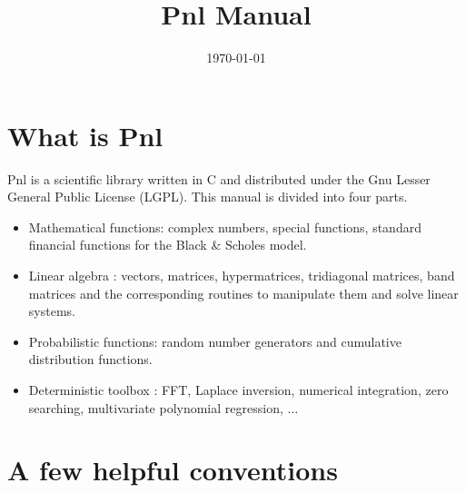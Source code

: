 \documentclass[a4paper,11pt,twoside]{article}
\title{Pnl Manual}
\date{\today}
\author{}
\begin{document}
\maketitle
\tableofcontents

\section{What is Pnl}

Pnl is a scientific library written in C and distributed under
the Gnu Lesser General Public License (LGPL). This manual is divided into four
parts.
\begin{itemize}
\item Mathematical functions: complex numbers, special functions, standard
  financial functions for the Black \& Scholes model.
\item Linear algebra : vectors, matrices, hypermatrices, tridiagonal matrices,
  band matrices and the corresponding routines to manipulate them and solve linear systems.
\item Probabilistic functions: random number generators and  cumulative
  distribution functions.
\item Deterministic toolbox : FFT, Laplace inversion, numerical integration, zero searching,
  multivariate polynomial regression, $\dots$
\end{itemize}

\section{A few helpful conventions}
\end{document}
